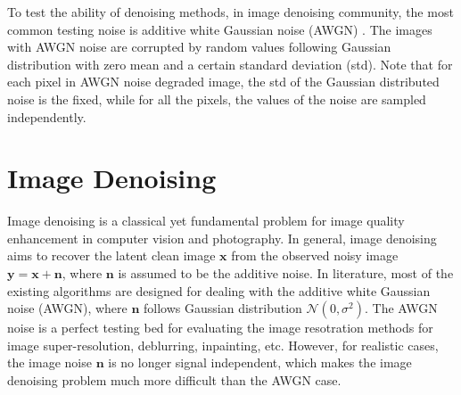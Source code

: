 To test the ability of denoising methods, in image denoising community, the most common testing noise is additive white Gaussian noise (AWGN) \cite{bm3d,ksvd}. The images with AWGN noise are corrupted by random values following Gaussian distribution with zero mean and a certain standard deviation (std). Note that for each pixel in AWGN noise degraded image, the std of the Gaussian distributed noise is the fixed, while for all the pixels, the values of the noise are sampled independently. 

\section{Image Denoising}

Image denoising is a classical yet fundamental problem for image quality enhancement in computer vision and photography. In general, image denoising aims to recover the latent clean image $\bm{x}$ from the observed noisy image $\bm{y}=\bm{x}+\bm{n}$, where $\bm{n}$ is assumed to be the additive noise. In literature, most of the existing algorithms are designed for dealing with the additive white Gaussian noise (AWGN), where $\bm{n}$ follows Gaussian distribution $\mathcal{N}(0,\sigma^{2})$.  The AWGN noise is a perfect testing bed for evaluating the image resotration methods for image super-resolution, deblurring, inpainting, etc. However, for realistic cases, the image noise $\bm{n}$ is no longer signal independent, which makes the image denoising problem much more difficult than the AWGN case.


